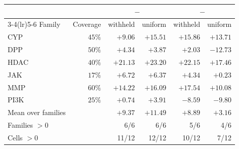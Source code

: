 \begin{tabular}{lrrrrr}
\toprule
 & & \multicolumn{2}{c}{\mt{} $-$ \stl{}} & \multicolumn{2}{c}{\pooled{} $-$ \stl{}} \\
\cmidrule(lr){3-4}\cmidrule(lr){5-6}
Family & Coverage & withheld & uniform & withheld & uniform \\
\midrule
CYP & $45\%$ & $+9.06$ & $+15.51$ & $+15.86$ & $+13.71$ \\
DPP & $50\%$ & $+4.34$ & $+3.87$ & $+2.03$ & $-12.73$ \\
HDAC & $40\%$ & $+21.13$ & $+23.20$ & $+22.15$ & $+17.46$ \\
JAK & $17\%$ & $+6.72$ & $+6.37$ & $+4.34$ & $+0.23$ \\
MMP & $60\%$ & $+14.22$ & $+16.09$ & $+17.54$ & $+10.08$ \\
PI3K & $25\%$ & $+0.74$ & $+3.91$ & $-8.59$ & $-9.80$ \\
\midrule
Mean over families & & $+9.37$ & $+11.49$ & $+8.89$ & $+3.16$ \\
Families $>0$ & & 6/6 & 6/6 & 5/6 & 4/6 \\
Cells $>0$ & & 11/12 & 12/12 & 10/12 & 7/12 \\
\bottomrule
\end{tabular}
